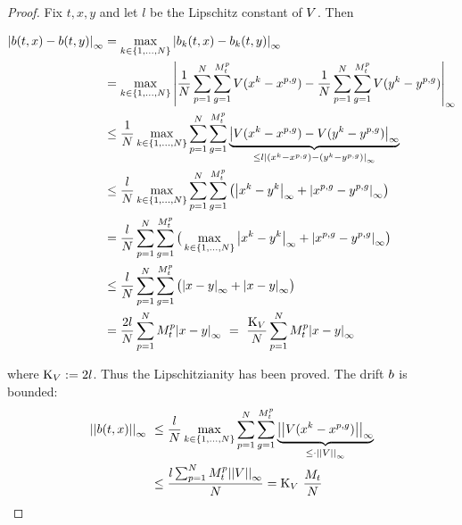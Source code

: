 \begin{proof}
Fix $t,x,y$ and let $l$ be the Lipschitz constant of $V$. Then

\begin{equation*}
\begin{aligned}
	{ \left|  b(t, x) - b(t, y)  \right|_{\infty} }
	&= \max_{k\in\{1,\ldots,N\}} { \left|  b_k(t, x) - b_k(t, y)  \right|_{\infty} }
	\\
	&= \max_{k\in\{1,\ldots,N\}} { \left| 
			\frac{1}{N} \sum_{p=1}^{N} \sum_{g = 1}^{M_t^p} V(x^k - x^{p,g}) 
			- \frac{1}{N} \sum_{p=1}^{N} \sum _{g = 1} ^{M_t^p} V(y^k - y^{p,g}) 
		 \right|_{\infty} }
	\\
	& \leq \frac{1}{N} \max_{k\in\{1,\ldots,N\}}
			\sum_{p=1}^{N} \sum_{g = 1}^{M_t^p}
			\underbrace{{ \left|  V(x^k - x^{p,g}) - V(y^k - y^{p,g})  \right|_{\infty} }}
			_{\leq l { \left| (x^k - x^{p,g}) - (y^k - y^{p,g}) \right|_{\infty} } }
	\\
	& \leq \frac{l}{N} \max_{k\in\{1,\ldots,N\}}
		\sum_{p=1}^{N} \sum_{g = 1}^{M_t^p}
			\big(
			{ \left| x^k - y^k  \right|_{\infty} } + { \left|  x^{p,g} - y^{p,g} \right|_{\infty} }
			\big)
	\\
	& = \frac{l}{N} \sum_{p=1}^{N} \sum_{g = 1}^{M_t^p}
	\big(
		\max_{k\in\{1,\ldots,N\}} { \left| x^k - y^k \right|_{\infty} } + { \left| x^{p,g} - y^{p,g} \right|_{\infty} }
	\big)
	\\
	& \leq \frac{l}{N} \sum_{p=1}^{N} \sum_{g = 1}^{M_t^p}
	\big(
		{ \left| x - y  \right|_{\infty} } + { \left|  x - y \right|_{\infty} }
	\big) 
	\\
	&= \frac{2l}{N} \sum_{p=1}^{N} M_t^p { \left| x - y  \right|_{\infty} }\
	=\
	\frac{\text{K}_V}{N} \sum_{p=1}^{N} M_t^p { \left| x - y  \right|_{\infty} }
\end{aligned}
\end{equation*}

where $\text{K}_V := 2l$. Thus the Lipschitzianity has been proved.
The drift $b$ is bounded:
\begin{equation*}
\begin{aligned}
{ \left| \left| b(t,x) \right| \right|_{\infty} }\
	& \leq \frac{l}{N} \max_{k\in\{1,\ldots,N\}}
		\sum_{p=1}^{N} \sum_{g = 1}^{M_t^p}
		\underbrace{{ \left| \left| V(x^k - x^{p,g}) \right| \right|_{\infty} }}
			_{\leq \cdot { \left| \left|  V\right| \right|_{\infty} }}
	\\
	&
	\leq \frac{l \sum_{p=1}^{N} M_t^p { \left| \left| V \right| \right|_{\infty} }}{N}
	= 
	\text{K}_{V}\
	\frac{M_t}{N}
\end{aligned}
\end{equation*}
\end{proof}

